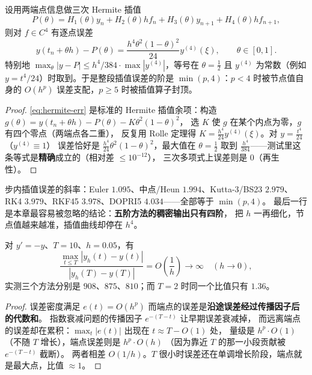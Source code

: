 \begin{theorem}
\label{thm:dense}
设用两端点信息做三次 Hermite 插值
\begin{equation}
  P(\theta)=H_1(\theta)y_n+H_2(\theta)hf_n+H_3(\theta)y_{n+1}+H_4(\theta)hf_{n+1},
  \label{eq:hermite}
\end{equation}
则对 $f\in C^4$ 有逐点误差
\begin{equation}
  y(t_n+\theta h)-P(\theta)=\frac{h^4\theta^2(1-\theta)^2}{24}y^{(4)}(\xi),\qquad \theta\in[0,1].
  \label{eq:hermite-err}
\end{equation}
特别地 $\max_\theta|y-P|\le h^4/384\cdot\max|y^{(4)}|$，等号在 $\theta=\frac12$ 且
$y^{(4)}$ 为常数（例如 $y=t^4/24$）时取到。于是整段插值误差的阶是
$\min(p,4)$：$p<4$ 时被节点值自身的 $O(h^p)$ 误差支配，$p\ge5$ 时被插值算子封顶。
\end{theorem}

\begin{proof}
\eqref{eq:hermite-err} 是标准的 Hermite 插值余项：构造
$g(\theta)=y(t_n+\theta h)-P(\theta)-K\theta^2(1-\theta)^2$，
选 $K$ 使 $g$ 在某个内点为零，$g$ 有四个零点（两端点各二重），
反复用 Rolle 定理得 $K=\frac{h^4}{24}y^{(4)}(\xi)$。对 $y=\frac{t^4}{24}$（$y^{(4)}\equiv1$）
误差恰好是 $\frac{h^4}{24}\theta^2(1-\theta)^2$，最大值在 $\theta=\frac12$ 取到
$\frac{h^4}{384}$——测试里这条等式是\textbf{精确}成立的（相对差 $\le10^{-12}$），
三次多项式上误差则是 $0$（再生性）。
\end{proof}

\begin{remark}[实测]
步内插值误差的斜率：Euler $1.095$、中点/Heun $1.994$、Kutta-3/BS23 $2.979$、
RK4 $3.979$、RKF45 $3.978$、DOPRI5 $4.034$——全部等于 $\min(p,4)$。
最后一行是本章最容易被忽略的结论：\textbf{五阶方法的稠密输出只有四阶}，
把 $h$ 一再细化，节点值越来越准，插值曲线却停在 $h^4$。
\end{remark}

\begin{theorem}[端点误差不是误差]
\label{thm:endpoint}
对 $y'=-y$、$T=10$、$h=0.05$，有
\begin{equation}
  \frac{\max_{t\le T}|y_h(t)-y(t)|}{|y_h(T)-y(T)|}=O\!\left(\frac{1}{h}\right)\to\infty
  \quad(h\to0),
\end{equation}
实测三个方法分别是 $908$、$875$、$810$；而 $T=2$ 时同一个比值只有 $1.36$。
\end{theorem}

\begin{proof}
误差密度满足 $e(t)=O(h^p)$ 而端点的误差是\textbf{沿途误差经过传播因子后的代数和}。
指数衰减问题的传播因子 $e^{-(T-t)}$ 让早期误差衰减掉，
而远离端点的误差却在累积：$\max_t|e(t)|$ 出现在 $t\approx T-O(1)$ 处，
量级是 $h^p\cdot O(1)$（不随 $T$ 增长），端点误差则是 $h^p\cdot O(h)$
（因为靠近 $T$ 的那一小段贡献被 $e^{-(T-t)}$ 截断）。
两者相差 $O(1/h)$。$T$ 很小时误差还在单调增长阶段，端点就是最大点，比值 $\approx1$。
\end{proof}

